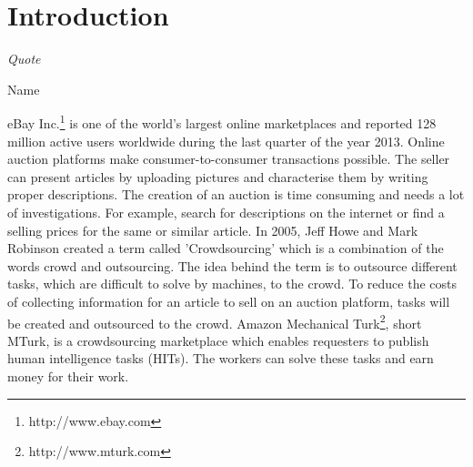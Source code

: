 \documentclass[a4paper]{report}
\begin{document}
  




%

\pagestyle{fancy} %
\fancyhf{}
\fancyhead[L]{\nouppercase{\leftmark}}
\fancyhead[C]{}
\fancyhead[R]{\thepage}
\renewcommand{\headrulewidth}{0.4pt} %
\newpage





\tableofcontents
\newpage

\listoffigures

\listoftables

\lstlistoflistings

\chapter{Introduction}
\epigraph{\textit{Quote}}{Name}
eBay Inc.\footnote{http://www.ebay.com} is one of the world's largest online marketplaces and reported 128 million active users worldwide during the last quarter of the year 2013. Online auction platforms make consumer-to-consumer transactions possible. The seller can present articles by uploading pictures and characterise them by writing proper descriptions. The creation of an auction is time consuming and needs a lot of investigations. For example, search for descriptions on the internet or find a selling prices for the same or similar article. In 2005, Jeff Howe and Mark Robinson created a term called 'Crowdsourcing' which is a combination of the words crowd and outsourcing. The idea behind the term is to outsource different tasks, which are difficult to solve by machines, to the crowd. To reduce the costs of collecting information for an article to sell on an auction platform, tasks will be created and outsourced to the crowd. Amazon Mechanical Turk\footnote{http://www.mturk.com}, short MTurk, is a crowdsourcing marketplace which enables requesters to publish human intelligence tasks (HITs). The workers can solve these tasks and earn money for their work.
\end{document}
